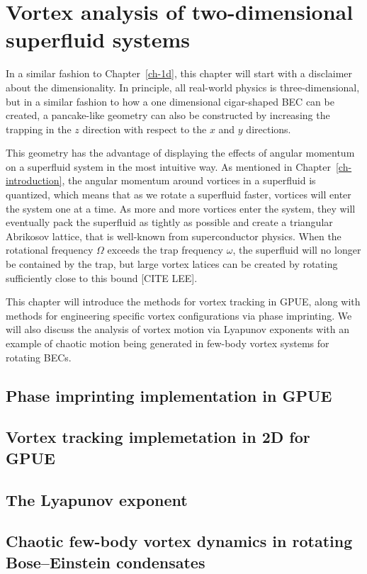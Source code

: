 \chapter{Vortex analysis of two-dimensional superfluid systems}
\label{ch:2d}

In a similar fashion to Chapter~\ref{ch-1d}, this chapter will start with a disclaimer about the dimensionality.
In principle, all real-world physics is three-dimensional, but in a similar fashion to how a one dimensional cigar-shaped BEC can be created, a pancake-like geometry can also be constructed by increasing the trapping in the $z$ direction with respect to the $x$ and $y$ directions.

This geometry has the advantage of displaying the effects of angular momentum on a superfluid system in the most intuitive way.
As mentioned in Chapter~\ref{ch-introduction}, the angular momentum around vortices in a superfluid is quantized, which means that as we rotate a superfluid faster, vortices will enter the system one at a time.
As more and more vortices enter the system, they will eventually pack the superfluid as tightly as possible and create a triangular Abrikosov lattice, that is well-known from superconductor physics.
When the rotational frequency $\Omega$ exceeds the trap frequency $\omega$, the superfluid will no longer be contained by the trap, but large vortex latices can be created by rotating sufficiently close to this bound [CITE LEE].

This chapter will introduce the methods for vortex tracking in GPUE, along with methods for engineering specific vortex configurations via phase imprinting.
We will also discuss the analysis of vortex motion via Lyapunov exponents with an example of chaotic motion being generated in few-body vortex systems for rotating BECs.


\section{Phase imprinting implementation in GPUE}
\section{Vortex tracking implemetation in 2D for GPUE}
\section{The Lyapunov exponent}

\section{Chaotic few-body vortex dynamics in rotating Bose--Einstein condensates}
